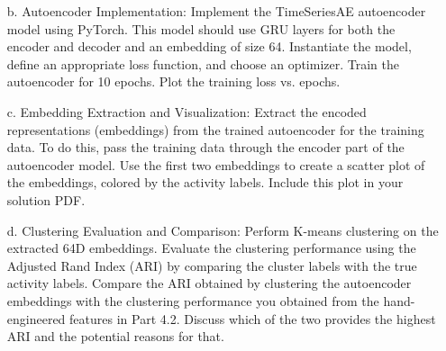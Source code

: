 \documentclass[a3paper,12pt]{extarticle} %
\begin{document}
\begin{enumerate}
\begin{itemize}
\item[b.] Autoencoder Implementation: Implement the TimeSeriesAE autoencoder model using PyTorch. This model should use GRU layers for both the encoder and decoder and an embedding of size 64. Instantiate the model, define an appropriate loss function, and choose an optimizer. Train the autoencoder for 10 epochs. Plot the training loss vs. epochs.

\item[c.] Embedding Extraction and Visualization: Extract the encoded representations (embeddings) from the trained autoencoder for the training data. To do this, pass the training data through the encoder part of the autoencoder model. Use the first two embeddings to create a scatter plot of the embeddings, colored by the activity labels. Include this plot in your solution PDF.

\item[d.] Clustering Evaluation and Comparison: Perform K-means clustering on the extracted 64D embeddings. Evaluate the clustering performance using the Adjusted Rand Index (ARI) by comparing the cluster labels with the true activity labels. Compare the ARI obtained by clustering the autoencoder embeddings with the clustering performance you obtained from the hand-engineered features in Part 4.2. Discuss which of the two provides the highest ARI and the potential reasons for that.
\end{itemize}

\end{enumerate}
\end{document}
